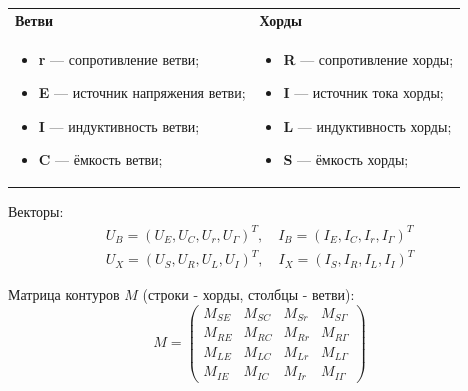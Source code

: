 	\begin{tabular}{p{} p{}}
		\textbf{Ветви} &
		\textbf{Хорды} \\
		\begin{itemize}[leftmargin=*, label=--, nosep]
			\item \textbf{r} — сопротивление ветви;
			\item \textbf{E} — источник напряжения ветви;
			\item \textbf{I} — индуктивность ветви;
			\item \textbf{C} — ёмкость ветви;
		\end{itemize}
		&
		\begin{itemize}[leftmargin=*, label=--, nosep]
			\item \textbf{R} — сопротивление хорды;
			\item \textbf{I} — источник тока хорды;
			\item \textbf{L} — индуктивность хорды;
			\item \textbf{S} — ёмкость хорды;
		\end{itemize}
	\end{tabular}
	\par
	Векторы:
	\begin{equation}
		\begin{aligned}
			U_B = (U_E, U_C, U_r, U_\Gamma)^T, \quad I_B = (I_E, I_C, I_r, I_\Gamma)^T \\
			U_X = (U_S, U_R, U_L, U_I)^T, \quad I_X = (I_S, I_R, I_L, I_I)^T
		\end{aligned}
	\end{equation}

	Матрица контуров $M$ (строки - хорды, столбцы - ветви):
	\vspace{-0.5em}
	\begin{equation}
		M = \begin{pmatrix}
			M_{SE} & M_{SC} & M_{Sr} & M_{S\Gamma} \\
			M_{RE} & M_{RC} & M_{Rr} & M_{R\Gamma} \\
			M_{LE} & M_{LC} & M_{Lr} & M_{L\Gamma} \\
			M_{IE} & M_{IC} & M_{Ir} & M_{I\Gamma}
		\end{pmatrix}
	\end{equation}
	\vspace{-2.5em}
